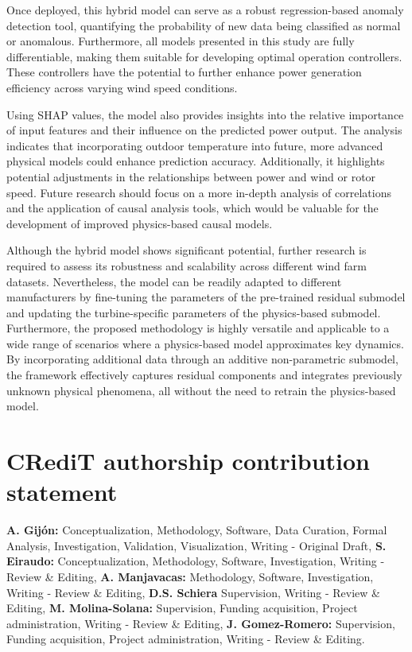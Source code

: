 \documentclass[preprint,12pt]{elsarticle}
\begin{document}
Once deployed, this hybrid model can serve as a robust regression-based anomaly detection tool,  quantifying the probability of new data being classified as normal or anomalous. Furthermore, all models presented in this study are fully differentiable, making them suitable for developing optimal operation controllers. These controllers have the potential to further enhance power generation efficiency across varying wind speed conditions.

Using SHAP values, the model also provides insights into the relative importance of input features and their influence on the predicted power output. The analysis indicates that incorporating outdoor temperature into future, more advanced physical models could enhance prediction accuracy. Additionally, it highlights potential adjustments in the relationships between power and wind or rotor speed. Future research should focus on a more in-depth analysis of correlations and the application of causal analysis tools, which would be valuable for the development of improved physics-based causal models.

Although the hybrid model shows significant potential, further research is required to assess its robustness and scalability across different wind farm datasets. Nevertheless,  the model can be readily adapted to different manufacturers by fine-tuning the parameters of the pre-trained residual submodel and updating the turbine-specific parameters of the physics-based submodel. Furthermore, the proposed methodology is highly versatile and applicable to a wide range of scenarios where a physics-based model approximates key dynamics. By incorporating additional data through an additive non-parametric submodel, the framework effectively captures residual components and integrates previously unknown physical phenomena, all without the need to retrain the physics-based model.

\section*{CRediT authorship contribution statement}
\textbf{A. Gijón:} Conceptualization, Methodology, Software, Data Curation, Formal Analysis, Investigation, Validation, Visualization,  Writing - Original Draft, 
\textbf{S. Eiraudo:} Conceptualization, Methodology, Software, Investigation, Writing - Review \& Editing,
\textbf{A. Manjavacas:} Methodology, Software, Investigation, Writing - Review \& Editing, \textbf{D.S. Schiera} Supervision, Writing - Review \& Editing, 
\textbf{M. Molina-Solana:} Supervision, Funding acquisition, Project administration, Writing - Review \& Editing, \textbf{J. Gomez-Romero:} Supervision,  Funding acquisition, Project administration, Writing - Review \& Editing.
\end{document}
